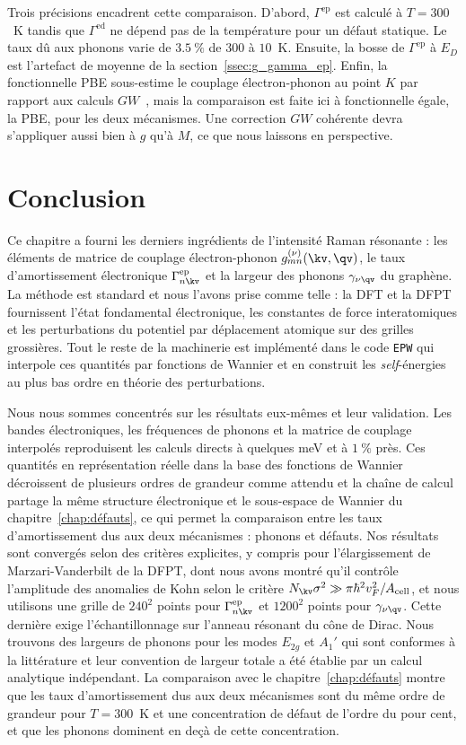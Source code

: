 Trois précisions encadrent cette comparaison. D'abord, $\Gamma^\text{ep}$ est calculé à $T=300$~K tandis que $\Gamma^\text{ed}$ ne dépend pas de la température pour un défaut statique. Le taux dû aux phonons varie de $3.5~\%$ de $300$ à $10$~K. Ensuite, la bosse de $\Gamma^\text{ep}$ à $E_D$ est l'artefact de moyenne de la section~\ref{ssec:g_gamma_ep}. Enfin, la fonctionnelle PBE sous-estime le couplage électron-phonon au point $K$ par rapport aux calculs $GW$~\cite{lazzeriImpactElectronelectronCorrelation2008}, mais la comparaison est faite ici à fonctionnelle égale, la PBE, pour les deux mécanismes. Une correction $GW$ cohérente devra s'appliquer aussi bien à $g$ qu'à $M$, ce que nous laissons en perspective.

\newpage
\section{Conclusion}\label{sec:g_conclusion}

Ce chapitre a fourni les derniers ingrédients de l'intensité Raman résonante : les éléments de matrice de couplage électron-phonon $g^{(\nu)}_{mn}(\kv,\qv)$, le taux d'amortissement électronique $\Gamma^\text{ep}_{n\kv}$ et la largeur des phonons $\gamma_{\nu\qv}$ du graphène. La méthode est standard et nous l'avons prise comme telle : la DFT et la DFPT fournissent l'état fondamental électronique, les constantes de force interatomiques et les perturbations du potentiel par déplacement atomique sur des grilles grossières. Tout le reste de la machinerie est implémenté dans le code \texttt{EPW} qui interpole ces quantités par fonctions de Wannier et en construit les \textit{self}-énergies au plus bas ordre en théorie des perturbations.

Nous nous sommes concentrés sur les résultats eux-mêmes et leur validation. Les bandes électroniques, les fréquences de phonons et la matrice de couplage interpolés reproduisent les calculs directs à quelques meV et à $1~\%$ près. Ces quantités en représentation réelle dans la base des fonctions de Wannier décroissent de plusieurs ordres de grandeur comme attendu et la chaîne de calcul partage la même structure électronique et le sous-espace de Wannier du chapitre~\ref{chap:défauts}, ce qui permet la comparaison entre les taux d'amortissement dus aux deux mécanismes : phonons et défauts. Nos résultats sont convergés selon des critères explicites, y compris pour l'élargissement de Marzari-Vanderbilt de la DFPT, dont nous avons montré qu'il contrôle l'amplitude des anomalies de Kohn selon le critère $N_\kv\sigma^2\gg\pi\hbar^2v_F^2/A_\text{cell}$, et nous utilisons une grille de $240^2$ points pour $\Gamma_{n\kv}^\text{ep}$ et $1200^2$ points pour $\gamma_{\nu\qv}$. Cette dernière exige l'échantillonnage sur l'anneau résonant du cône de Dirac. Nous trouvons des largeurs de phonons pour les modes $E_{2g}$ et $A_1'$ qui sont conformes à la littérature et leur convention de largeur totale a été établie par un calcul analytique indépendant. La comparaison avec le chapitre~\ref{chap:défauts} montre que les taux d'amortissement dus aux deux mécanismes sont du même ordre de grandeur pour $T=300$~K et une concentration de défaut de l'ordre du pour cent, et que les phonons dominent en deçà de cette concentration.

